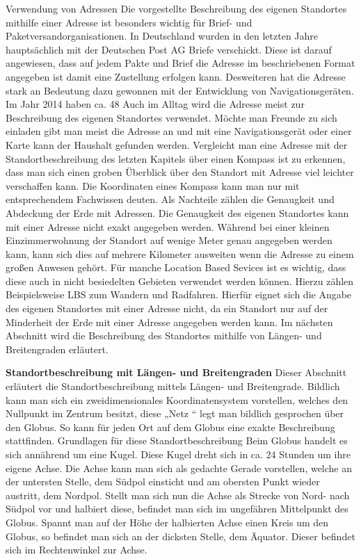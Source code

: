 Verwendung von Adressen
Die vorgestellte Beschreibung des eigenen Standortes mithilfe einer Adresse ist besonders wichtig für Brief- und Paketversandorganisationen. In Deutschland wurden in den letzten Jahre hauptsächlich mit der Deutschen Post AG Briefe verschickt. Diese ist darauf angewiesen, dass auf jedem Pakte und Brief die Adresse im beschriebenen Format angegeben ist damit eine Zustellung erfolgen kann.
Desweiteren  hat die Adresse stark an Bedeutung dazu gewonnen mit der Entwicklung von Navigationsgeräten. Im Jahr 2014 haben ca. 48%
Auch im Alltag wird die Adresse meist zur Beschreibung des eigenen Standortes verwendet. Möchte man Freunde zu sich einladen gibt man meist die Adresse an und mit eine Navigationsgerät oder einer Karte kann der Haushalt gefunden werden.
Vergleicht man eine Adresse mit der Standortbeschreibung des letzten Kapitels über einen Kompass ist zu erkennen, dass man sich einen groben Überblick über den Standort mit Adresse viel leichter verschaffen kann. Die Koordinaten eines Kompass kann man nur mit entsprechendem Fachwissen deuten. 
Als Nachteile zählen die Genaugkeit und Abdeckung der Erde mit Adressen. Die Genaugkeit des eigenen Standortes kann mit einer Adresse nicht exakt angegeben werden. Während bei einer kleinen Einzimmerwohnung der Standort auf wenige Meter genau angegeben werden kann, kann sich dies auf mehrere Kilometer ausweiten wenn die Adresse zu einem großen Anwesen gehört. Für manche Location Based Sevices ist es wichtig, dass diese auch in nicht besiedelten Gebieten verwendet werden können. Hierzu zählen Beispielsweise LBS zum Wandern und Radfahren. Hierfür eignet sich die Angabe des eigenen Standortes mit einer Adresse nicht, da ein Standort nur auf der Minderheit der Erde mit einer Adresse angegeben werden kann. 
Im nächsten Abschnitt wird die Beschreibung des Standortes mithilfe von Längen- und Breitengraden erläutert.

\textbf{Standortbeschreibung mit Längen- und Breitengraden}
Dieser Abschnitt erläutert die Standortbeschreibung mittels Längen- und Breitengrade.
Bildlich kann man sich ein zweidimensionales Koordinatensystem vorstellen, welches den Nullpunkt im Zentrum besitzt, diese „Netz “ legt man bildlich gesprochen über den Globus. So kann für jeden Ort auf dem Globus eine exakte Beschreibung stattfinden. 
Grundlagen für diese Standortbeschreibung
Beim Globus handelt es sich annährend um eine Kugel. Diese Kugel dreht sich in ca. 24 Stunden um ihre eigene Achse. Die Achse kann man sich als gedachte Gerade vorstellen, welche an der untersten Stelle, dem Südpol einsticht und am obersten Punkt wieder austritt, dem Nordpol. Stellt man sich nun die Achse als Strecke von Nord- nach Südpol vor und halbiert diese, befindet man sich im ungefähren Mittelpunkt des Globus. Spannt man auf der Höhe der halbierten Achse einen Kreis um den Globus, so befindet man sich an der dicksten Stelle, dem Äquator. Dieser befindet sich im Rechtenwinkel zur Achse.

